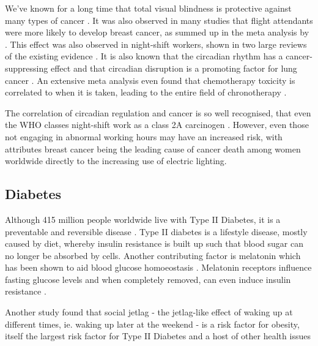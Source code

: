 We've known for a long time that total visual blindness is protective against many types of cancer \citep{hahnProfoundBilateralBlindness1991, feychtingReducedCancerIncidence1998, flynn-evansTotalVisualBlindness2009}. It was also observed in many studies that flight attendants were more likely to develop breast cancer, as summed up in the meta analysis by \citet{tokumaruIncidenceCancerFemale2006}. This effect was also observed in night-shift workers, shown in two large reviews of the existing evidence \citep{kolstadNightshiftWorkRisk2008, stevensLightatnightCircadianDisruption2009}. It is also known that the circadian rhythm has a cancer-suppressing effect \citep{fuCircadianClockPacemaker2003} and that circadian disruption is a promoting factor for lung cancer \citep{papagiannakopoulosCircadianRhythmDisruption2016}. An extensive meta analysis even found that chemotherapy toxicity is correlated to when it is taken, leading to the entire field of chronotherapy \citep{focanCircadianRhythmsCancer1995, dallmannChronopharmacologyNewInsights2014}.

The correlation of circadian regulation and cancer is so well recognised, that even the WHO classes night-shift work as a class 2A carcinogen \citep{whoBreastCancerConundrum2013}. However, even those not engaging in abnormal working hours may have an increased risk, with \citet{stevensBreastCancerCircadian2014} attributes breast cancer being the leading cause of cancer death among women worldwide directly to the increasing use of electric lighting.

\subsection{Diabetes}

Although 415 million people worldwide live with Type II Diabetes, it is a preventable and reversible disease \citep{fungDiabetesCodePrevent2018}. Type II diabetes is a lifestyle disease, mostly caused by diet, whereby insulin resistance is built up such that blood sugar can no longer be absorbed by cells. Another contributing factor is melatonin which has been shown to aid blood glucose homoeostasis \citep{bouatia-najiVariantMTNR1BAssociated2009}. Melatonin receptors influence fasting glucose levels \citep{prokopenkoVariantsMTNR1BInfluence2009} and when completely removed, can even induce insulin resistance \citep{contreras-alcantaraRemovalMelatoninReceptor2010}.

Another study found that social jetlag - the jetlag-like effect of waking up at different times, ie. waking up later at the weekend - is a risk factor for obesity, itself the largest risk factor for Type II Diabetes and a host of other health issues \citep{roennebergSocialJetlagObesity2012}

